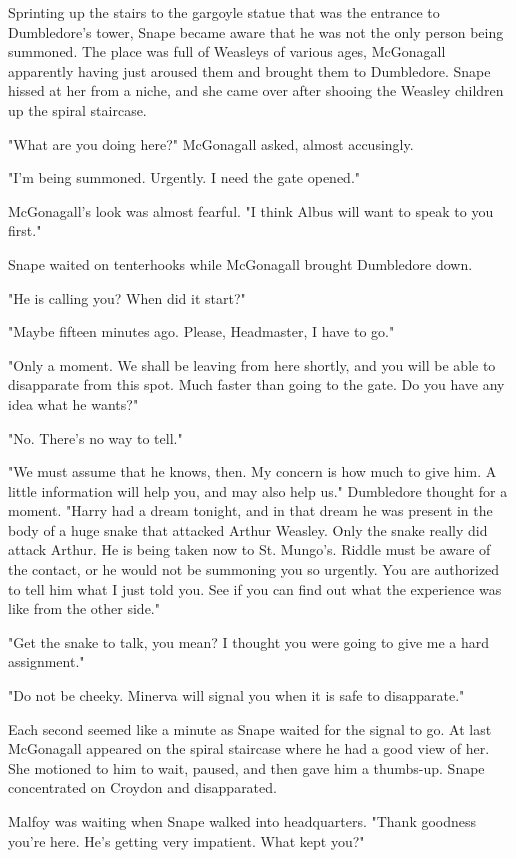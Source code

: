 Sprinting up the stairs to the gargoyle statue that was the entrance to Dumbledore's tower, Snape became aware that he was not the only person being summoned. The place was full of Weasleys of various ages, McGonagall apparently having just aroused them and brought them to Dumbledore. Snape hissed at her from a niche, and she came over after shooing the Weasley children up the spiral staircase.

"What are you doing here?" McGonagall asked, almost accusingly.

"I'm being summoned. Urgently. I need the gate opened."

McGonagall's look was almost fearful. "I think Albus will want to speak to you first."

Snape waited on tenterhooks while McGonagall brought Dumbledore down.

"He is calling you? When did it start?"

"Maybe fifteen minutes ago. Please, Headmaster, I have to go."

"Only a moment. We shall be leaving from here shortly, and you will be able to disapparate from this spot. Much faster than going to the gate. Do you have any idea what he wants?"

"No. There's no way to tell."

"We must assume that he knows, then. My concern is how much to give him. A little information will help you, and may also help us." Dumbledore thought for a moment. "Harry had a dream tonight, and in that dream he was present in the body of a huge snake that attacked Arthur Weasley. Only the snake really did attack Arthur. He is being taken now to St. Mungo's. Riddle must be aware of the contact, or he would not be summoning you so urgently. You are authorized to tell him what I just told you. See if you can find out what the experience was like from the other side."

"Get the snake to talk, you mean? I thought you were going to give me a hard assignment."

"Do not be cheeky. Minerva will signal you when it is safe to disapparate."

Each second seemed like a minute as Snape waited for the signal to go. At last McGonagall appeared on the spiral staircase where he had a good view of her. She motioned to him to wait, paused, and then gave him a thumbs-up. Snape concentrated on Croydon and disapparated.

Malfoy was waiting when Snape walked into headquarters. "Thank goodness you're here. He's getting very impatient. What kept you?"

